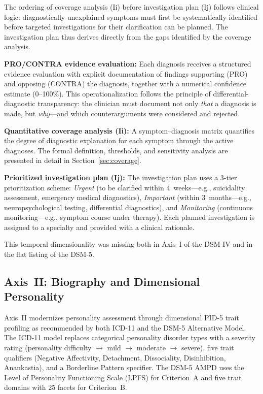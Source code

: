 \documentclass[11pt,a4paper]{article}
\begin{document}
The ordering of coverage analysis (Ii) before investigation plan (Ij) follows clinical logic: diagnostically unexplained symptoms must first be systematically identified before targeted investigations for their clarification can be planned. The investigation plan thus derives directly from the gaps identified by the coverage analysis.

\textbf{PRO/CONTRA evidence evaluation:} Each diagnosis receives a structured evidence evaluation with explicit documentation of findings supporting (PRO) and opposing (CONTRA) the diagnosis, together with a numerical confidence estimate (0--100\%). This operationalization follows the principle of differential-diagnostic transparency: the clinician must document not only \textit{that} a diagnosis is made, but \textit{why}---and which counterarguments were considered and rejected.

\textbf{Quantitative coverage analysis (Ii):} A symptom--diagnosis matrix quantifies the degree of diagnostic explanation for each symptom through the active diagnoses. The formal definition, thresholds, and sensitivity analysis are presented in detail in Section~\ref{sec:coverage}.

\textbf{Prioritized investigation plan (Ij):} The investigation plan uses a 3-tier prioritization scheme: \textit{Urgent} (to be clarified within 4~weeks---e.g., suicidality assessment, emergency medical diagnostics), \textit{Important} (within 3~months---e.g., neuropsychological testing, differential diagnostics), and \textit{Monitoring} (continuous monitoring---e.g., symptom course under therapy). Each planned investigation is assigned to a specialty and provided with a clinical rationale.

This temporal dimensionality was missing both in Axis~I of the DSM-IV and in the flat listing of the DSM-5.

\subsection{Axis~II: Biography and Dimensional Personality}

Axis~II modernizes personality assessment through dimensional PID-5 trait profiling as recommended by both ICD-11 and the DSM-5 Alternative Model. The ICD-11 model replaces categorical personality disorder types with a severity rating (personality difficulty $\to$ mild $\to$ moderate $\to$ severe), five trait qualifiers (Negative Affectivity, Detachment, Dissociality, Disinhibition, Anankastia), and a Borderline Pattern specifier. The DSM-5 AMPD uses the Level of Personality Functioning Scale (LPFS) for Criterion~A and five trait domains with 25 facets for Criterion~B.
\end{document}
